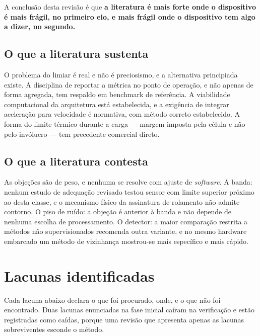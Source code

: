 A conclusão desta revisão é que \textbf{a literatura é mais forte onde o dispositivo é mais
frágil, no primeiro elo, e mais frágil onde o dispositivo tem algo a dizer, no segundo.}

\subsection{O que a literatura sustenta}

O problema do limiar é real e não é preciosismo, e a alternativa principiada existe. A
disciplina de reportar a métrica no ponto de operação, e não apenas de forma agregada, tem
respaldo em benchmark de referência. A viabilidade computacional da arquitetura está
estabelecida, e a exigência de integrar aceleração para velocidade é normativa, com método
correto estabelecido. A forma do limite térmico durante a carga --- margem imposta pela
célula e não pelo invólucro --- tem precedente comercial direto.

\subsection{O que a literatura contesta}

As objeções são de peso, e nenhuma se resolve com ajuste de \emph{software}. A banda:
nenhum estudo de adequação revisado testou sensor com limite superior próximo ao desta
classe, e o mecanismo físico da assinatura de rolamento não admite contorno. O piso de
ruído: a objeção é anterior à banda e não depende de nenhuma escolha de processamento. O
detector: a maior comparação restrita a métodos não supervisionados recomenda outra
variante, e no mesmo hardware embarcado um método de vizinhança mostrou-se mais específico
e mais rápido. 

\section{Lacunas identificadas}
\label{sec:rev-lacunas}

Cada lacuna abaixo declara o que foi procurado, onde, e o que não foi encontrado. Duas
lacunas enunciadas na fase inicial caíram na verificação e estão registradas como caídas,
porque uma revisão que apresenta apenas as lacunas sobreviventes esconde o método.

